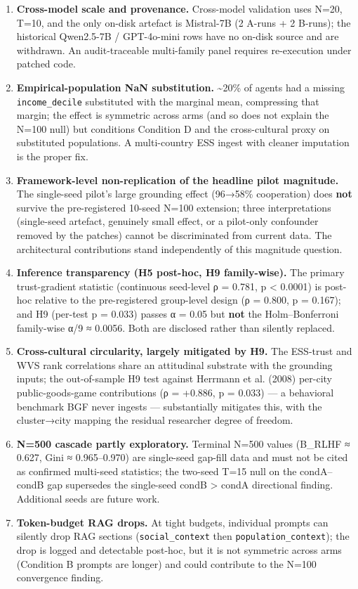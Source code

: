 \begin{enumerate}
\item \textbf{Cross-model scale and provenance.} Cross-model validation uses N=20, T=10, and the only on-disk artefact is Mistral-7B (2 A-runs + 2 B-runs); the historical Qwen2.5-7B / GPT-4o-mini rows have no on-disk source and are withdrawn. An audit-traceable multi-family panel requires re-execution under patched code.
\item \textbf{Empirical-population NaN substitution.} \textasciitilde{}20\% of agents had a missing \texttt{income\_decile} substituted with the marginal mean, compressing that margin; the effect is symmetric across arms (and so does not explain the N=100 null) but conditions Condition D and the cross-cultural proxy on substituted populations. A multi-country ESS ingest with cleaner imputation is the proper fix.
\item \textbf{Framework-level non-replication of the headline pilot magnitude.} The single-seed pilot's large grounding effect (96→58\% cooperation) does \textbf{not} survive the pre-registered 10-seed N=100 extension; three interpretations (single-seed artefact, genuinely small effect, or a pilot-only confounder removed by the patches) cannot be discriminated from current data. The architectural contributions stand independently of this magnitude question.
\item \textbf{Inference transparency (H5 post-hoc, H9 family-wise).} The primary trust-gradient statistic (continuous seed-level ρ = 0.781, p < 0.0001) is post-hoc relative to the pre-registered group-level design (ρ = 0.800, p = 0.167); and H9 (per-test p = 0.033) passes α = 0.05 but \textbf{not} the Holm–Bonferroni family-wise α/9 ≈ 0.0056. Both are disclosed rather than silently replaced.
\item \textbf{Cross-cultural circularity, largely mitigated by H9.} The ESS-trust and WVS rank correlations share an attitudinal substrate with the grounding inputs; the out-of-sample H9 test against Herrmann et al. (2008) per-city public-goods-game contributions (ρ = +0.886, p = 0.033) — a behavioral benchmark BGF never ingests — substantially mitigates this, with the cluster→city mapping the residual researcher degree of freedom.
\item \textbf{N=500 cascade partly exploratory.} Terminal N=500 values (B\_RLHF ≈ 0.627, Gini ≈ 0.965–0.970) are single-seed gap-fill data and must not be cited as confirmed multi-seed statistics; the two-seed T=15 null on the condA–condB gap supersedes the single-seed condB > condA directional finding. Additional seeds are future work.
\item \textbf{Token-budget RAG drops.} At tight budgets, individual prompts can silently drop RAG sections (\texttt{social\_context} then \texttt{population\_context}); the drop is logged and detectable post-hoc, but it is not symmetric across arms (Condition B prompts are longer) and could contribute to the N=100 convergence finding.
\end{enumerate}


